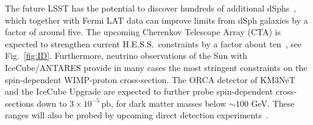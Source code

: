 \documentclass[../report.tex]{subfiles}
\begin{document}
The future LSST has the potential to discover hundreds of additional dSphs~\cite{Drlica-Wagner:2019xan}, which together with Fermi LAT data can improve limits from dSph galaxies by a factor of around five.  The upcoming Cherenkov Telescope Array (CTA) is expected to strengthen current H.E.S.S.~constraints by a factor about ten~\cite{Drlica-Wagner2019-nr, Carr2016-vl}, see Fig.~\ref{fig:ID}.
%
%
Furthermore, neutrino observations of the Sun with IceCube/ANTARES %
provide in many cases the most stringent constraints on the spin-dependent WIMP-proton cross-section.  The ORCA detector of KM3NeT and the IceCube Upgrade are expected to further probe spin-dependent cross-sections down to $3\times10^{-5}\,\text{pb}$, for dark matter masses below $\sim 100$ GeV.
These ranges will also be probed by upcoming direct detection experiments~\cite{sigmaSD-prospects}.
\end{document}
